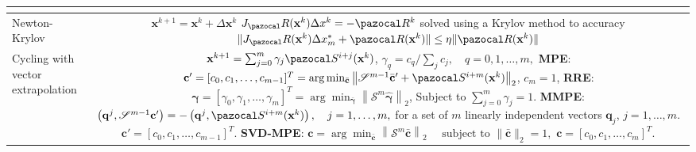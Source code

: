 \begin{table}[htbp]
\begin{tabular}{l c}
{    }\\
    \hline
    Newton-Krylov & \makecell[l]{\vphantom{\Huge |} \(\mathbf x^{k+1} = \mathbf x^{k} +\Delta \mathbf x^k\)\\
    \(J_\pazocal R(\mathbf x^k)\Delta x^k = -\pazocal R^k\) solved using a Krylov method\\
    to accuracy \(  \|J_\pazocal R(\mathbf x^k) \Delta x^*_m+ \pazocal R(\mathbf x^k)\| \leq \eta\|\pazocal R(\mathbf x^k)\|\)}
    \\
    \hline
    \makecell[l]{Cycling with\\ vector extrapolation} & \makecell[l]{\vphantom{\Huge |}
    \(\mathbf x^{k+1} = \sum_{j=0}^m \gamma_j \pazocal S^{i+j}(\mathbf x^k)\),\\
    \(\gamma_q = c_q/\sum_j c_j,\quad q=0,1,\dots,m,\)\\
    \textbf{MPE}: \(\mathbf c ' = [c_0,c_1,\dots,c_{m-1}]^T = \arg \min_{\bar{\mathbf c}} \left\|\mathscr S^{m-1} \bar{\mathbf c}^\prime + \pazocal S^{i+m}(\mathbf x^k)\right\|_2\),\\
    \(c_m=1\),\\
    \textbf{RRE}: \(\boldsymbol{\gamma} = [\gamma_0,\gamma_1,\dots,\gamma_{m}]^T = \arg \min_{\bar{\boldsymbol{ \gamma}}} \left\|\mathscr S^{m} \hat{\boldsymbol{\gamma}}\right\|_2\),\\
    Subject to \(\sum_{j=0}^m \gamma_j =1\).\\
    \textbf{MMPE}: \(\left(\mathbf q^{j}, \mathscr S^{m-1} \mathbf c^{\prime}\right)=-\left(\mathbf q^{j}, \pazocal S^{i+m}(\mathbf x^k)\right), \quad j=1, \ldots, m,\)\\
    for a set of \(m\) linearly independent vectors \(\mathbf q_j\), \(j=1, \dots, m\).\\
    \(\mathbf c ' = [c_0,c_1,\dots,c_{m-1}]^T.\)\\
    \textbf{SVD-MPE}: \(\mathbf c = \arg\min_{\bar{\mathbf c}}\left\|\mathscr S^{m} \bar{\mathbf c}\right\|_{2} \quad \text { subject to }\|\bar{\mathbf c}\|_{2}=1,\)\\
    \(\mathbf c=\left[c_{0}, c_{1}, \ldots, c_{m}\right]^{T}\).
    }\\
  \hline\hline
  \end{tabular}
\end{table}
